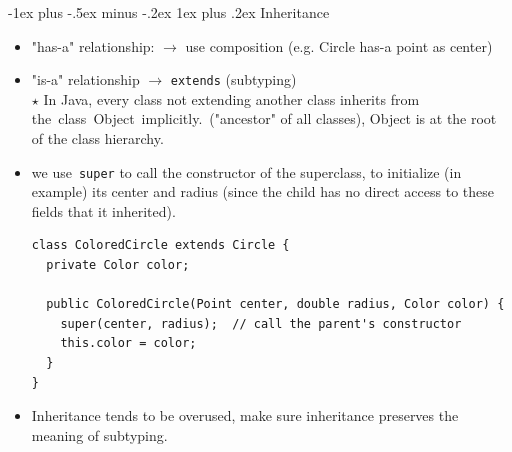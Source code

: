 \documentclass[12pt, landscape]{article}
\makeatletter
\newcommand{\code}[1]{\colorbox{gray!25!}{\lstinline|#1|}}
\renewcommand{\subsubsection}{\@startsection{subsubsection}{3}{0.1mm}%
                                {-1ex plus -.5ex minus -.2ex}%
                                {1ex plus .2ex}%
                                {\normalfont\small\bfseries}}
\makeatother
\begin{document}
\begin{multicols*}{3}
\subsubsection{Inheritance}
\begin{itemize}
	\item "has-a" relationship:  $\rightarrow$ use composition (e.g. Circle has-a point as center)
	\item "is-a" relationship $\rightarrow$ \code{extends} (subtyping) \\
	$\star$ In Java, every class not extending another class inherits from the class Object implicitly. ("ancestor" of all classes), Object is at the root of the class hierarchy. 
	\item we use \code{super} to call the constructor of the superclass, to initialize (in example) its center and radius (since the child has no direct access to these fields that it inherited).
\begin{lstlisting}
class ColoredCircle extends Circle {
  private Color color;

  public ColoredCircle(Point center, double radius, Color color) {
    super(center, radius);  // call the parent's constructor
    this.color = color;
  }
}
\end{lstlisting}

	\item Inheritance tends to be overused, make sure inheritance preserves the meaning of subtyping.

\end{itemize}



\end{multicols*}
\end{document}
